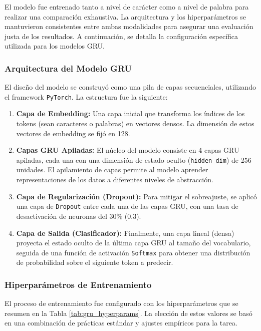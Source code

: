 El modelo fue entrenado tanto a nivel de carácter como a nivel de palabra para realizar una comparación exhaustiva. La arquitectura y los hiperparámetros se mantuvieron consistentes entre ambas modalidades para asegurar una evaluación justa de los resultados. A continuación, se detalla la configuración específica utilizada para los modelos GRU.

\subsubsection{Arquitectura del Modelo GRU}

El diseño del modelo se construyó como una pila de capas secuenciales, utilizando el framework \texttt{PyTorch}. La estructura fue la siguiente:

\begin{enumerate}
    \item \textbf{Capa de Embedding:} Una capa inicial que transforma los índices de los tokens (sean caracteres o palabras) en vectores densos. La dimensión de estos vectores de embedding se fijó en 128.

    \item \textbf{Capas GRU Apiladas:} El núcleo del modelo consiste en 4 capas GRU apiladas, cada una con una dimensión de estado oculto (\texttt{hidden\_dim}) de 256 unidades. El apilamiento de capas permite al modelo aprender representaciones de los datos a diferentes niveles de abstracción.

    \item \textbf{Capa de Regularización (Dropout):} Para mitigar el sobreajuste, se aplicó una capa de \texttt{Dropout} entre cada una de las capas GRU, con una tasa de desactivación de neuronas del 30\% (0.3).

    \item \textbf{Capa de Salida (Clasificador):} Finalmente, una capa lineal (densa) proyecta el estado oculto de la última capa GRU al tamaño del vocabulario, seguida de una función de activación \texttt{Softmax} para obtener una distribución de probabilidad sobre el siguiente token a predecir.
\end{enumerate}

\subsubsection{Hiperparámetros de Entrenamiento}

El proceso de entrenamiento fue configurado con los hiperparámetros que se resumen en la Tabla \ref{tab:gru_hyperparams}. La elección de estos valores se basó en una combinación de prácticas estándar y ajustes empíricos para la tarea.

